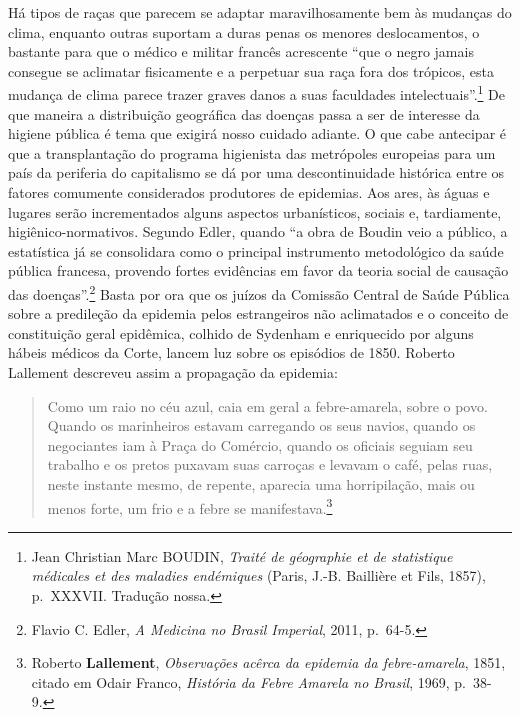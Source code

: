 Há tipos de raças que parecem se adaptar maravilhosamente bem às
mudanças do clima, enquanto outras suportam a duras penas os menores
deslocamentos, o bastante para que o médico e militar francês acrescente
``que o negro jamais consegue se aclimatar fisicamente e a perpetuar sua
raça fora dos trópicos, esta mudança de clima parece trazer graves danos
a suas faculdades intelectuais''.\footnote{Jean Christian Marc BOUDIN,
  \emph{Traité de géographie et de statistique médicales et des maladies
  endémiques} (Paris, J.-B. Baillière et Fils, 1857), p.~XXXVII.
  Tradução nossa.} De que maneira a distribuição geográfica das doenças
passa a ser de interesse da higiene pública é tema que exigirá nosso
cuidado adiante. O que cabe antecipar é que a transplantação do programa
higienista das metrópoles europeias para um país da periferia do
capitalismo se dá por uma descontinuidade histórica entre os fatores
comumente considerados produtores de epidemias. Aos ares, às águas e
lugares serão incrementados alguns aspectos urbanísticos, sociais e,
tardiamente, higiênico-normativos. Segundo Edler, quando ``a obra de
Boudin veio a público, a estatística já se consolidara como o principal
instrumento metodológico da saúde pública francesa, provendo fortes
evidências em favor da teoria social de causação das
doenças''.\footnote{Flavio C. Edler, \emph{A Medicina no Brasil
  Imperial}, 2011, p.~64-5.} Basta por ora que os juízos da Comissão
Central de Saúde Pública sobre a predileção da epidemia pelos
estrangeiros não aclimatados e o conceito de constituição geral
epidêmica, colhido de Sydenham e enriquecido por alguns hábeis médicos
da Corte, lancem luz sobre os episódios de 1850. Roberto Lallement
descreveu assim a propagação da epidemia:

\begin{quote}
Como um raio no céu azul, caia em geral a febre-amarela, sobre o povo.
Quando os marinheiros estavam carregando os seus navios, quando os
negociantes iam à Praça do Comércio, quando os oficiais seguiam seu
trabalho e os pretos puxavam suas carroças e levavam o café, pelas ruas,
neste instante mesmo, de repente, aparecia uma horripilação, mais ou
menos forte, um frio e a febre se manifestava.\footnote{Roberto
  \textbf{Lallement}, \emph{Observações acêrca da epidemia da
  febre-amarela}, 1851, citado em Odair Franco, \emph{História da Febre
  Amarela no Brasil}, 1969, p.~38-9.}
\end{quote}

